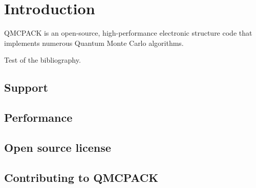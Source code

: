 \chapter{Introduction}

QMCPACK is an open-source, high-performance electronic structure code that implements numerous Quantum Monte Carlo algorithms.

Test of the bibliography\cite{CeperleyAlderPRL1980}.

\section{Support}
\section{Performance}
\section{Open source license}
\section{Contributing to QMCPACK}
